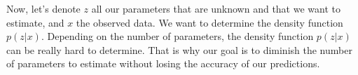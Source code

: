 Now, let's denote $z$ all our parameters that are unknown and that we want to estimate, and $x$ the observed data. We want to determine the density function $p(z|x)$. Depending on the number of parameters, the density function $p(z|x)$ can be really hard to determine. That is why our goal is to diminish the number of parameters to estimate without losing the accuracy of our predictions.